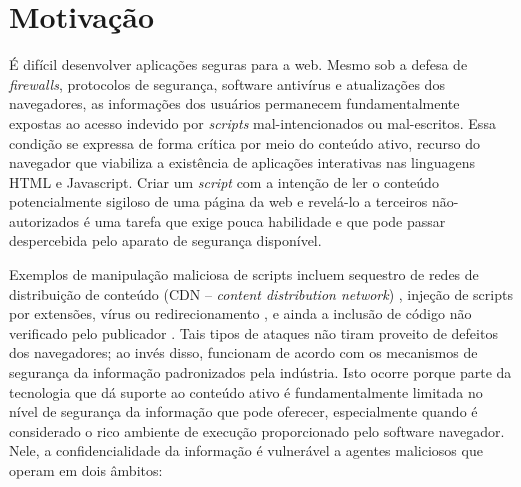 \section{Motivação}


É difícil desenvolver aplicações seguras para a web. Mesmo sob a defesa de \textit{firewalls}, protocolos de segurança, software antivírus e atualizações dos navegadores, as informações dos usuários permanecem fundamentalmente expostas ao acesso indevido por \textit{scripts} mal-intencionados ou mal-escritos. Essa condição se expressa de forma crítica por meio do conteúdo ativo, recurso do navegador que viabiliza a existência de aplicações interativas nas linguagens HTML e Javascript. Criar um \textit{script} com a intenção de ler o conteúdo potencialmente sigiloso de uma página da web e revelá-lo a terceiros não-autorizados é uma tarefa que exige pouca habilidade e que pode passar despercebida pelo aparato de segurança disponível.

Exemplos de manipulação maliciosa de scripts incluem sequestro de redes de distribuição de conteúdo (CDN -- \textit{content distribution network}) \cite{Dorfman2013}, injeção de scripts por extensões, vírus ou redirecionamento \cite{Kinlan2015}, e ainda a inclusão de código não verificado pelo publicador \cite{Vanunu2016}. Tais tipos de ataques não tiram proveito de defeitos dos navegadores; ao invés disso, funcionam de acordo com os mecanismos de segurança da informação padronizados pela indústria. Isto ocorre porque parte da tecnologia que dá suporte ao conteúdo ativo é fundamentalmente limitada no nível de segurança da informação que pode oferecer, especialmente quando é considerado o rico ambiente de execução proporcionado pelo software navegador. Nele, a confidencialidade da informação é vulnerável a agentes maliciosos que operam em dois âmbitos:

